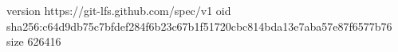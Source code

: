 version https://git-lfs.github.com/spec/v1
oid sha256:c64d9db75c7bfdef284f6b23c67b1f51720cbc814bda13e7aba57e87f6577b76
size 626416
